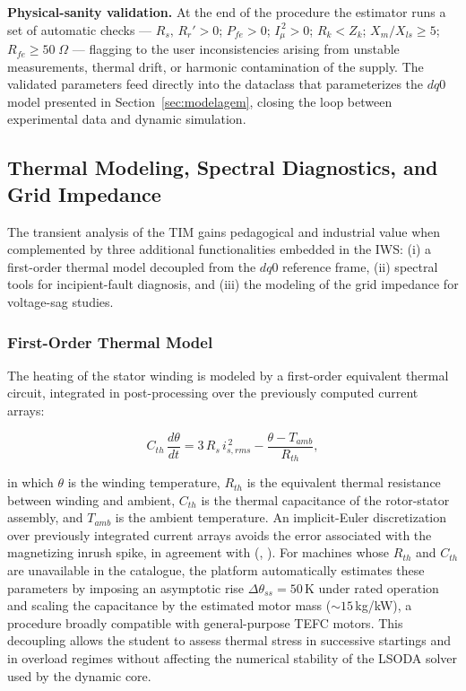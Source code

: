 \documentclass[a4paper]{ifacconf}
\begin{document}
\textbf{Physical-sanity validation.} At the end of the procedure the estimator runs a set of automatic checks --- $R_s,\,R_r' > 0$; $P_{fe} > 0$; $I_\mu^{\,2} > 0$; $R_k < Z_k$; $X_m/X_{ls} \geq 5$; $R_{fe} \geq 50\;\Omega$ --- flagging to the user inconsistencies arising from unstable measurements, thermal drift, or harmonic contamination of the supply. The validated parameters feed directly into the dataclass that parameterizes the $dq0$ model presented in Section~\ref{sec:modelagem}, closing the loop between experimental data and dynamic simulation.

\subsection{Thermal Modeling, Spectral Diagnostics, and Grid Impedance}
\label{subsec:diagnostico_en}

The transient analysis of the TIM gains pedagogical and industrial value when complemented by three additional functionalities embedded in the IWS: (i) a first-order thermal model decoupled from the $dq0$ reference frame, (ii) spectral tools for incipient-fault diagnosis, and (iii) the modeling of the grid impedance for voltage-sag studies.

\subsubsection{First-Order Thermal Model}

The heating of the stator winding is modeled by a first-order equivalent thermal circuit, integrated in post-processing over the previously computed current arrays:

\begin{equation}
\label{eq:thermal_en}
C_{th}\,\frac{d\theta}{dt} = 3\,R_s\,i_{s,rms}^{\,2} - \frac{\theta - T_{amb}}{R_{th}},
\end{equation}

\noindent in which $\theta$ is the winding temperature, $R_{th}$ is the equivalent thermal resistance between winding and ambient, $C_{th}$ is the thermal capacitance of the rotor-stator assembly, and $T_{amb}$ is the ambient temperature. An implicit-Euler discretization over previously integrated current arrays avoids the error associated with the magnetizing inrush spike, in agreement with (\citeauthor{karakas2009aggregation}, \citeyear{karakas2009aggregation}). For machines whose $R_{th}$ and $C_{th}$ are unavailable in the catalogue, the platform automatically estimates these parameters by imposing an asymptotic rise $\Delta\theta_{ss} = 50\,$K under rated operation and scaling the capacitance by the estimated motor mass ($\sim 15\,$kg/kW), a procedure broadly compatible with general-purpose TEFC motors. This decoupling allows the student to assess thermal stress in successive startings and in overload regimes without affecting the numerical stability of the LSODA solver used by the dynamic core.
\end{document}
